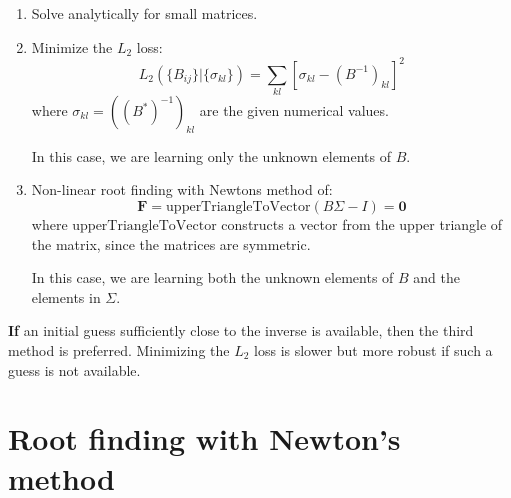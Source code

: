 \documentclass[11pt]{article}
\begin{document}
\begin{enumerate}
\item Solve analytically for small matrices.

\item Minimize the $L_2$ loss:
\begin{equation}
L_2( \{ B_{ij} \} | \{ \sigma_{kl} \} ) = \sum_{kl} \left [ \sigma_{kl} - (B^{-1})_{kl} \right ]^2
\end{equation}
where $\sigma_{kl} = ((B^*)^{-1})_{kl}$ are the given numerical values.

In this case, we are learning only the unknown elements of $B$.

\item Non-linear root finding with Newtons method of:
\begin{equation}
\boldsymbol{F} 
= \text{upperTriangleToVector}(B \Sigma - I)
= \boldsymbol{0}
\end{equation}
where $\text{upperTriangleToVector}$ constructs a vector from the upper triangle of the matrix, since the matrices are symmetric.

In this case, we are learning both the unknown elements of $B$ and the elements in $\Sigma$.

\end{enumerate}

\textbf{If} an initial guess sufficiently close to the inverse is available, then the third method is preferred. Minimizing the $L_2$ loss is slower but more robust if such a guess is not available.


\section{Root finding with Newton's method}

\end{document}
